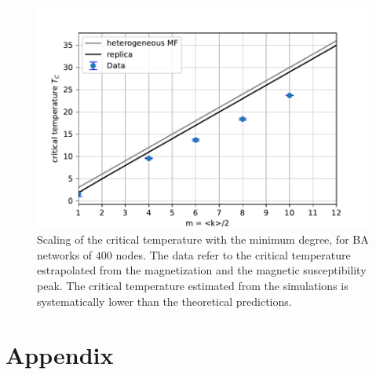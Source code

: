\begin{figure}[H]
    \centering
    \includegraphics[width=0.8\linewidth]{latex_source/images/ising/BA_temperatures.pdf}
    \caption{Scaling of the critical temperature with the minimum degree, for BA networks of $400$ nodes. The data refer to the critical temperature estrapolated from the magnetization and the magnetic susceptibility peak. The critical temperature estimated from the simulations is systematically lower than the theoretical predictions.}
    \label{fig:final_ising}
\end{figure}

\newpage
\section*{Appendix}
